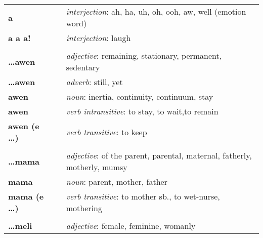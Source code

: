 \begin{supertabular}{p{2,5cm}|ll}
    \textbf{a}               &  & \textit{interjection}: ah, ha, uh, oh, ooh, aw, well (emotion word)                          \\ %
    \textbf{a a a!}          &  & \textit{interjection}: laugh                                                                 \\ %
                             &  &                                                                                              \\ %
    \textbf{\dots awen}      &  & \textit{adjective}: remaining, stationary, permanent, sedentary                              \\ %
    \textbf{\dots awen}      &  & \textit{adverb}: still, yet                                                                  \\ %
    \textbf{awen}            &  & \textit{noun}: inertia, continuity, continuum, stay                                          \\ %
    \textbf{awen}            &  & \textit{verb intransitive}: to stay, to wait,to remain                                       \\ %
    \textbf{awen (e \dots)}  &  & \textit{verb transitive}: to keep                                                            \\ %
                             &  &                                                                                              \\ %
    \textbf{\dots mama}      &  & \textit{adjective}: of the parent, parental, maternal, fatherly, motherly, mumsy             \\ %
    \textbf{mama}            &  & \textit{noun}: parent, mother, father                                                        \\ %
    \textbf{mama (e \dots)}  &  & \textit{verb transitive}: to mother sb., to wet-nurse, mothering                             \\ %
                             &  &                                                                                              \\ %
    \textbf{\dots meli}      &  & \textit{adjective}: female, feminine, womanly                                                \\ %

\end{supertabular}
